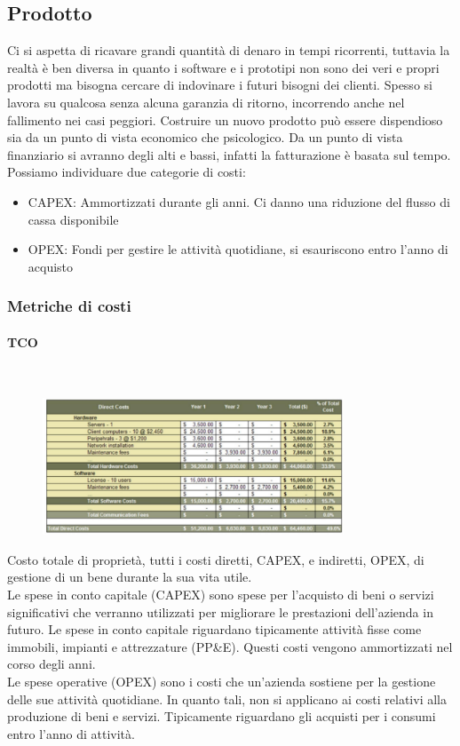 \documentclass{article}
\begin{document}
		\subsection{Prodotto}
		Ci si aspetta di ricavare grandi quantità di denaro in tempi ricorrenti, tuttavia la realtà è ben diversa in quanto i software e i prototipi non sono dei veri e propri prodotti ma bisogna cercare di indovinare i futuri bisogni dei clienti. 
		Spesso si lavora su qualcosa senza alcuna garanzia di ritorno, incorrendo anche nel fallimento nei casi peggiori. Costruire un nuovo prodotto può essere dispendioso sia da un punto di vista economico che psicologico.
		Da un punto di vista finanziario si avranno degli alti e bassi, infatti la fatturazione è basata sul tempo.\\
		Possiamo individuare due categorie di costi:
		\begin{itemize}
			\item CAPEX: Ammortizzati durante gli anni. Ci danno una riduzione del flusso di cassa disponibile
			\item OPEX: Fondi per gestire le attività quotidiane, si esauriscono entro l'anno di acquisto
		\end{itemize}
		
		\subsubsection{Metriche di costi}
		\paragraph{TCO} \mbox{}\\
		
		\begin{figure}[ht]
			\centering
			\includegraphics[width=0.8\textwidth]{SAC_D1_TCOExample.png}
		\end{figure}
		Costo totale di proprietà, tutti i costi diretti, CAPEX, e indiretti, OPEX, di gestione di un bene durante la sua vita utile.\\
		Le spese in conto capitale (CAPEX) sono spese per l'acquisto di beni o servizi significativi che verranno utilizzati per migliorare le prestazioni dell'azienda in futuro. Le spese in conto capitale riguardano tipicamente attività fisse come immobili, impianti e attrezzature (PP\&E). Questi costi vengono ammortizzati nel corso degli anni.\\
		Le spese operative (OPEX) sono i costi che un'azienda sostiene per la gestione delle sue attività quotidiane. In quanto tali, non si applicano ai costi relativi alla produzione di beni e servizi. Tipicamente riguardano gli acquisti per i consumi entro l'anno di attività.\\
		
\end{document}
